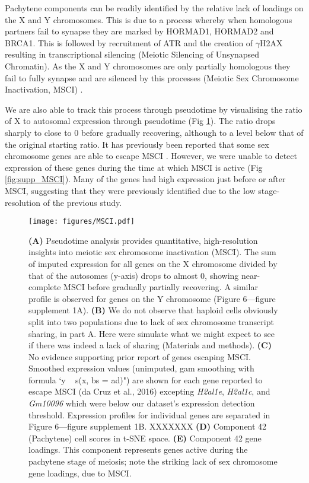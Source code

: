 Pachytene components can be readily identified by the relative lack of loadings on the X and Y chromosomes. This is due to a process whereby when homologous partners fail to synapse they are marked by HORMAD1, HORMAD2 and BRCA1. This is followed by recruitment of ATR and the creation of $\gamma$H2AX resulting in transcriptional silencing (Meiotic Silencing of Unsynapsed Chromatin). As the X and Y chromosomes are only partially homologous they fail to fully synapse and are silenced by this processes (Meiotic Sex Chromosome Inactivation, MSCI) \parencite{Turner2007Meiotic, Turner2015Meiotic}.

We are also able to track this process through pseudotime by visualising the ratio of X to autosomal expression through pseudotime (Fig \ref{fig:MSCI}). The ratio drops sharply to close to 0 before gradually recovering, although to a level below that of the original starting ratio. It has previously been reported that some sex chromosome genes are able to escape MSCI \parencite{daCruz2016Transcriptome, Soumillon2013Cellular}. However, we were unable to detect expression of these genes during the time at which MSCI is active (Fig \ref{fig:supp_MSCI}). Many of the genes had high expression just before or after MSCI, suggesting that they were previously identified due to the low stage-resolution of the previous study. 

\begin{figure}[H]
	\centering
	\texttt{[image: figures/MSCI.pdf]}
	\caption{
		\textbf{(A)} Pseudotime analysis provides quantitative, high-resolution insights into meiotic sex chromosome inactivation (MSCI). The sum of imputed expression for all genes on the X chromosome divided by that of the autosomes (y-axis) drops to almost 0, showing near-complete MSCI before gradually partially recovering. A similar profile is observed for genes on the Y chromosome (Figure 6—figure supplement 1A).
		\textbf{(B)} We do not observe that haploid cells obviously split into two populations due to lack of sex chromosome transcript sharing, in part A. Here were simulate what we might expect to see if there was indeed a lack of sharing (Materials and methods).
		\textbf{(C)} No evidence supporting prior report of genes escaping MSCI. Smoothed expression values (unimputed, gam smoothing with formula ‘y ~ s(x, bs = ad)") are shown for each gene reported to escape MSCI (da Cruz et al., 2016) excepting \textit{H2al1e}, \textit{H2al1c}, and \textit{Gm10096} which were below our dataset’s expression detection threshold. Expression profiles for individual genes are separated in Figure 6—figure supplement 1B. XXXXXXX
		\textbf{(D)} Component 42 (Pachytene) cell scores in t-SNE space.
		\textbf{(E)} Component 42 gene loadings. This component represents genes active during the pachytene stage of meiosis; note the striking lack of sex chromosome gene loadings, due to MSCI.
	}
	\label{fig:MSCI}
\end{figure}

